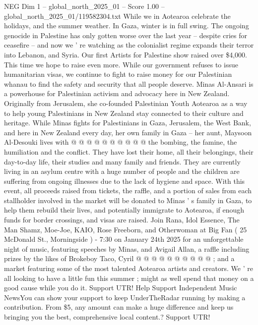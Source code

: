 \begin{textsample}{NEG Dim 1 – global\_north\_2025\_01 – Score 1.00 – global\_north\_2025\_01/119582304.txt}  \label{ex:f1_neg_061}
While we in Aotearoa celebrate the holidays, and the summer weather.
In Gaza, winter is in full swing.
The ongoing genocide in Palestine has only gotten worse over the last year -- despite cries for ceasefire -- and now we ' re watching as the colonialist regime expands their terror into Lebanon, and Syria.
Our first Artists for Palestine show raised over \$4,000.
This time we hope to raise even more.
While our government refuses to issue humanitarian visas, we continue to fight to raise money for our Palestinian whanau to find the safety and security that all people deserve.
Minas Al-Ansari is a powerhouse for Palestinian activism and advocacy here in New Zealand.
Originally from Jerusalem, she co-founded Palestinian Youth Aotearoa as a way to help young Palestinians in New Zealand stay connected to their culture and heritage.
While Minas fights for Palestinians in Gaza, Jerusalem, the West Bank, and here in New Zealand every day, her own family in Gaza -- her aunt, Maysoon Al-Desouki lives with @ @ @ @ @ @ @ @ @ @ the bombing, the famine, the humiliation and the conflict.
They have lost their home, all their belongings, their day-to-day life, their studies and many family and friends.
They are currently living in an asylum centre with a huge number of people and the children are suffering from ongoing illnesses due to the lack of hygiene and space.
With this event, all proceeds raised from tickets, the raffle, and a portion of sales from each stallholder involved in the market will be donated to Minas ' s family in Gaza, to help them rebuild their lives, and potentially immigrate to Aotearoa, if enough funds for border crossings, and visas are raised.
Join Rana, Idol Essence, The Man Shamz, Moe-Joe, KAIO, Rose Freeborn, and Otherwoman at Big Fan ( 25 McDonald St., Morningside ) - 7:30 on January 24th 2025 for an unforgettable night of music, featuring speeches by Minas, and Avigail Allan, a raffle including prizes by the likes of Brokeboy Taco, Cyril @ @ @ @ @ @ @ @ @ @ ; and a market featuring some of the most talented Aotearoa artists and creators.
We ' re all looking to have a little fun this summer ; might as well spend that money on a good cause while you do it.
Support UTR!
Help Support Independent Music NewsYou can show your support to keep UnderTheRadar running by making a contribution.
From \$5, any amount can make a huge difference and keep us bringing you the best, comprehensive local content.?
Support UTR!

\end{textsample}
